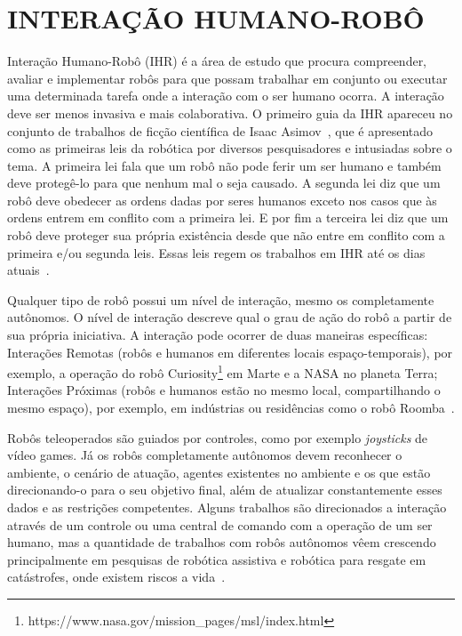 \chapter{INTERAÇÃO HUMANO-ROBÔ}
\label{cap:ihr}
Interação Humano-Robô (IHR) é a área de estudo que procura compreender, avaliar e implementar robôs para que possam trabalhar em conjunto ou executar uma determinada tarefa onde a interação com o ser humano ocorra. A interação deve ser menos invasiva e mais colaborativa. O primeiro guia da IHR apareceu no conjunto de trabalhos de ficção científica de Isaac Asimov~\cite{asimov:2004}, que é apresentado como as primeiras leis da robótica por diversos pesquisadores e intusiadas sobre o tema. A primeira lei fala que um robô não pode ferir um ser humano e também deve protegê-lo para que nenhum mal o seja causado. A segunda lei diz que um robô deve obedecer as ordens dadas por seres humanos exceto nos casos que às ordens entrem em conflito com a primeira lei. E por fim a terceira lei diz que um robô deve proteger sua própria existência desde que não entre em conflito com a primeira e/ou segunda leis. Essas leis regem os trabalhos em IHR até os dias atuais~\cite{goodrich:2007, weiss:2010}.

Qualquer tipo de robô possui um nível de interação, mesmo os completamente autônomos. O nível de interação descreve qual o grau de ação do robô a partir de sua própria iniciativa. A interação pode ocorrer de duas maneiras específicas: Interações Remotas (robôs e humanos em diferentes locais espaço-temporais), por exemplo, a operação do robô Curiosity\footnote{https://www.nasa.gov/mission\_pages/msl/index.html} em Marte e a NASA no planeta Terra; Interações Próximas (robôs e humanos estão no mesmo local, compartilhando o mesmo espaço), por exemplo, em indústrias ou residências como o robô Roomba~\cite{goodrich:2007}.

Robôs teleoperados são guiados por controles, como por exemplo \emph{joysticks} de vídeo games. Já os robôs completamente autônomos devem reconhecer o ambiente, o cenário de atuação, agentes existentes no ambiente e os que estão direcionando-o para o seu objetivo final, além de atualizar constantemente esses dados e as restrições competentes. Alguns trabalhos são direcionados a interação através de um controle ou uma central de comando com a operação de um ser humano, mas a quantidade de trabalhos com robôs autônomos vêem crescendo principalmente em pesquisas de robótica assistiva e robótica para resgate em catástrofes, onde existem riscos a vida~\cite{goodrich:2007, weiss:2010}.

